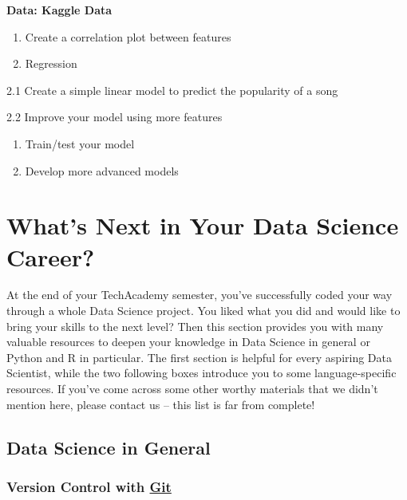 \documentclass[
  11pt,
]{book}
\begin{document}
\textbf{Data: Kaggle Data}

\begin{enumerate}
\def\labelenumi{\arabic{enumi}.}
\item
  Create a correlation plot between features
\item
  Regression
\end{enumerate}

2.1 Create a simple linear model to predict the popularity of a song

2.2 Improve your model using more features

\begin{enumerate}
\def\labelenumi{\arabic{enumi}.}
\setcounter{enumi}{2}
\item
  Train/test your model
\item
  Develop more advanced models
\end{enumerate}

\newpage

\hypertarget{whats-next-in-your-data-science-career}{%
\chapter{What's Next in Your Data Science Career?}\label{whats-next-in-your-data-science-career}}

At the end of your TechAcademy semester, you've successfully coded your way through a whole Data Science project. You liked what you did and would like to bring your skills to the next level? Then this section provides you with many valuable resources to deepen your knowledge in Data Science in general or Python and R in particular. The first section is helpful for every aspiring Data Scientist, while the two following boxes introduce you to some language-specific resources. If you've come across some other worthy materials that we didn't mention here, please contact us -- this list is far from complete!

\hypertarget{data-science-in-general}{%
\section{Data Science in General}\label{data-science-in-general}}

\hypertarget{version-control-with-git}{%
\subsection*{\texorpdfstring{Version Control with \href{https://github.com/}{Git}}{Version Control with Git}}\label{version-control-with-git}}
\end{document}
